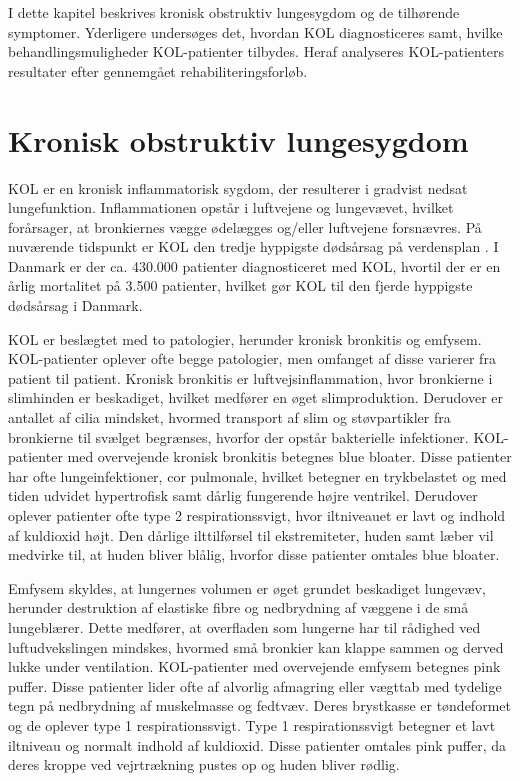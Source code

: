 I dette kapitel beskrives kronisk obstruktiv lungesygdom og de tilhørende symptomer. Yderligere undersøges det, hvordan KOL diagnosticeres samt, hvilke behandlingsmuligheder KOL-patienter tilbydes. Heraf analyseres KOL-patienters resultater efter gennemgået rehabiliteringsforløb.

\section{Kronisk obstruktiv lungesygdom}
KOL er en kronisk inflammatorisk sygdom, der resulterer i gradvist nedsat lungefunktion. Inflammationen opstår i luftvejene og lungevævet, hvilket forårsager, at bronkiernes vægge ødelægges og/eller luftvejene forsnævres. På nuværende tidspunkt er KOL den tredje hyppigste dødsårsag på verdensplan \cite{WHO2017}. I Danmark er der ca. 430.000 patienter diagnosticeret med KOL, hvortil der er en årlig mortalitet på 3.500 patienter, hvilket gør KOL til den fjerde hyppigste dødsårsag i Danmark. \cite{Basisbogen2016}


KOL er beslægtet med to patologier, herunder kronisk bronkitis og emfysem. KOL-patienter oplever ofte begge patologier, men omfanget af disse varierer fra patient til patient.\cite{Basisbogen2016}
Kronisk bronkitis er luftvejsinflammation, hvor bronkierne i slimhinden er beskadiget, hvilket medfører en øget slimproduktion. Derudover er antallet af cilia mindsket, hvormed transport af slim og støvpartikler fra bronkierne til svælget begrænses, hvorfor der opstår bakterielle infektioner.\cite{Frausing2011,Britannica2016} KOL-patienter med overvejende kronisk bronkitis betegnes blue bloater. Disse patienter har ofte lungeinfektioner, cor pulmonale, hvilket betegner en trykbelastet og med tiden udvidet hypertrofisk samt dårlig fungerende højre ventrikel. Derudover oplever patienter ofte  type 2 respirationssvigt, hvor iltniveauet er lavt og indhold af kuldioxid højt. Den dårlige ilttilførsel til ekstremiteter, huden samt læber vil medvirke til, at huden bliver blålig, hvorfor disse patienter omtales blue bloater.\cite{Healthguidances2016}

Emfysem skyldes, at lungernes volumen er øget grundet beskadiget lungevæv, herunder destruktion af elastiske fibre og nedbrydning af væggene i de små lungeblærer. Dette medfører, at overfladen som lungerne har til rådighed ved luftudvekslingen mindskes, hvormed små bronkier kan klappe sammen og derved lukke under ventilation.\cite{Frausing2011a,Flaschen-Hansen2008} KOL-patienter med overvejende emfysem betegnes pink puffer. Disse patienter lider ofte af alvorlig afmagring eller vægttab med tydelige tegn på nedbrydning af muskelmasse og fedtvæv. Deres brystkasse er tøndeformet og de oplever type 1 respirationssvigt. Type 1 respirationssvigt betegner et lavt iltniveau og normalt indhold af kuldioxid. Disse patienter omtales pink puffer, da deres kroppe ved vejrtrækning pustes op og huden bliver rødlig.\cite{Healthguidances2016}

